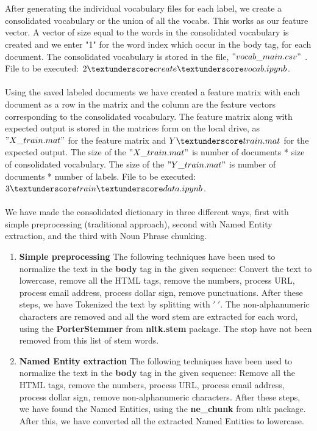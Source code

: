 \documentclass[fleqn,10pt]{SelfArx} %
\begin{document}
\begin{enumerate}
\\\\After generating the individual vocabulary files for each label, we create a consolidated vocabulary or the union of all the vocabs. This works as our feature vector. A vector of size equal to the words in the consolidated vocabulary is created and we enter "1" for the word index which occur in the body tag, for each document. The consolidated vocabulary is stored in the file, $"vocab\_main.csv"$ \cite{REF:8}.
\\File to be executed: $2\textunderscore create\textunderscore vocab.ipynb$.
\\\\Using the saved labeled documents we have created a feature matrix with each document as a row in the matrix and the column are the feature vectors corresponding to the consolidated vocabulary. The feature matrix along with expected output is stored in the matrices form on the local drive, as $"X\_train.mat"$ for the feature matrix and $Y\textunderscore train.mat$ for the expected output. The size of the $"X\_train.mat"$ is number of documents * size of consolidated vocabulary. The size of the $"Y\_train.mat"$ is number of documents * number of labels. File to be executed: $3\textunderscore train\textunderscore data.ipynb$.
\\\\We have made the consolidated dictionary in three different ways, first with simple preprocessing (traditional approach), second with Named Entity extraction, and the third with Noun Phrase chunking.
\begin{enumerate}
\item \textbf{Simple preprocessing}
The following techniques have been used to normalize the text in the \textbf{body} tag in the given sequence:
Convert the text to lowercase, remove all the HTML tags, remove the numbers, process URL, process email address, process dollar sign, remove punctuations. After these steps, we have Tokenized the text by splitting with $'\ '$. The non-alphanumeric characters are removed and all the word stem are extracted for each word, using the \textbf{PorterStemmer} from \textbf{nltk.stem} package. The stop have not been removed from this list of stem words.
\item\textbf{Named Entity extraction}
The following techniques have been used to normalize the text in the \textbf{body} tag in the given sequence:
Remove all the HTML tags, remove the numbers, process URL, process email address, process dollar sign, remove non-alphanumeric characters. After these steps, we have found the Named Entities, using the \textbf{ne\_chunk} from nltk package. After this, we have converted all the extracted Named Entities to lowercase.

\end{enumerate}
\end{enumerate}
\end{document}

